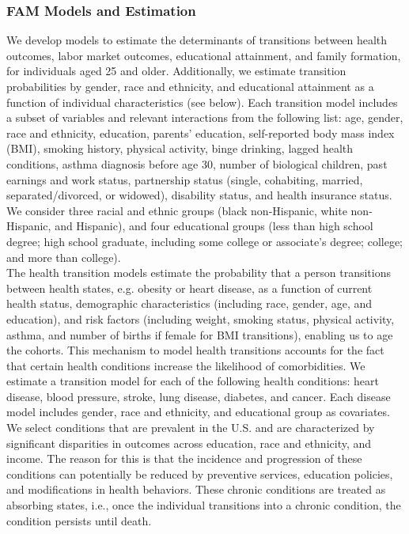 
\subsubsection{FAM Models and Estimation}
\label{section:FAM_models}

\noindent We develop models to estimate the determinants of transitions between health outcomes, labor market outcomes, educational attainment, and family formation, for individuals aged 25 and older.
Additionally, we estimate transition probabilities by gender, race and ethnicity, and educational attainment as a function of individual characteristics (see below).
Each transition model includes a subset of variables and relevant interactions from the following list: age, gender, race and ethnicity, education, parents' education, self-reported body mass index (BMI), smoking history, physical activity, binge drinking, lagged health conditions, asthma diagnosis before age 30, number of biological children, past earnings and work status, partnership status (single, cohabiting, married, separated/divorced, or widowed), disability status, and health insurance status.
We consider three racial and ethnic groups (black non-Hispanic, white non-Hispanic, and Hispanic), and four educational groups (less than high school degree; high school graduate, including some college or associate's degree; college; and more than college). \\

\noindent The health transition models estimate the probability that a person transitions between health states, e.g. obesity or heart disease, as a function of current health status, demographic characteristics (including race, gender, age, and education), and risk factors (including weight, smoking status, physical activity, asthma, and number of births if female for BMI transitions), enabling us to age the cohorts. This mechanism to model health transitions accounts for the fact that certain health conditions increase the likelihood of comorbidities.
We estimate a transition model for each of the following health conditions: heart disease, blood pressure, stroke, lung disease, diabetes, and cancer. Each disease model includes gender, race and ethnicity, and educational group as covariates.
We select conditions that are prevalent in the U.S. and are characterized by significant disparities in outcomes across education, race and ethnicity, and income.
The reason for this is that the incidence and progression of these conditions can potentially be reduced by preventive services, education policies, and modifications in health behaviors.
These chronic conditions are treated as absorbing states, i.e., once the individual transitions into a chronic condition, the condition persists until death. \\

